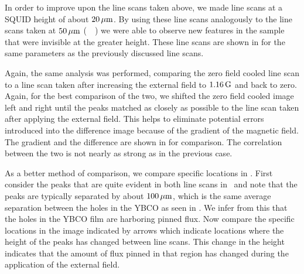 %
%

In order to improve upon the line scans taken above, we made 
line scans at 
a SQUID height of about $20\,\mu\mathrm{m}$.
By using these line scans analogously to the line scans 
taken at $50\,\mu\mathrm{m}$ (\cf\ \ )
we were able to observe new features in the sample that were
invisible at the greater height. These line scans are shown in
 for the same parameters as the
previously discussed line scans. 

Again, the same analysis was performed, comparing the zero
field cooled line scan to a line scan taken after increasing the
external field to $1.16\,\mathrm{G}$ and back to zero. 
Again, for the best 
comparison of the two, we shifted the zero field cooled image left
and right until the peaks matched as closely as possible to the 
line scan taken after applying the external field. 
This helps to eliminate potential errors 
introduced into the difference image because of the gradient of the
magnetic field. The gradient and the difference are shown in 
 for comparison. The correlation between
the two is not nearly as strong as in the previous case. 

As a better method of comparison, we compare specific locations in 
.  
First consider the peaks that are quite evident in both line scans
in \ and note that the peaks
are typically separated by about $100\,\mu\mathrm{m}$, which is the same 
average separation
between the holes in the YBCO as seen in . 
We infer from this that the holes in the YBCO film are harboring 
pinned flux. 
Now compare the 
specific locations in the image indicated 
by arrows which  indicate locations where the height of the 
peaks has changed between line scans.
This change in the height indicates that the amount of flux
pinned in that region has changed during the application
of the external field. 

